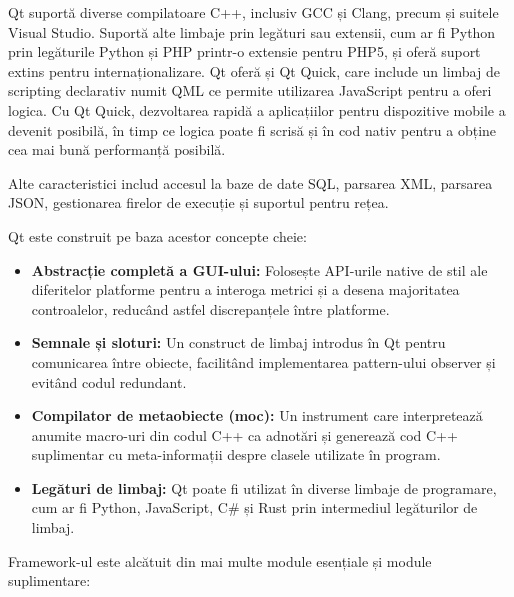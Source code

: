 \documentclass[a4paper,12pt]{report}
\begin{document}
Qt suportă diverse compilatoare C++, inclusiv GCC și Clang, precum și suitele Visual Studio. Suportă alte limbaje prin legături sau extensii, cum ar fi Python prin legăturile Python și PHP printr-o extensie pentru PHP5, și oferă suport extins pentru internaționalizare. Qt oferă și Qt Quick, care include un limbaj de scripting declarativ numit QML ce permite utilizarea JavaScript pentru a oferi logica. Cu Qt Quick, dezvoltarea rapidă a aplicațiilor pentru dispozitive mobile a devenit posibilă, în timp ce logica poate fi scrisă și în cod nativ pentru a obține cea mai bună performanță posibilă.

Alte caracteristici includ accesul la baze de date SQL, parsarea XML, parsarea JSON, gestionarea firelor de execuție și suportul pentru rețea.

Qt este construit pe baza acestor concepte cheie:
\begin{itemize}
    \item \textbf{Abstracție completă a GUI-ului:} Folosește API-urile native de stil ale diferitelor platforme pentru a interoga metrici și a desena majoritatea controalelor, reducând astfel discrepanțele între platforme.
    \item \textbf{Semnale și sloturi:} Un construct de limbaj introdus în Qt pentru comunicarea între obiecte, facilitând implementarea pattern-ului observer și evitând codul redundant.
    \item \textbf{Compilator de metaobiecte (moc):} Un instrument care interpretează anumite macro-uri din codul C++ ca adnotări și generează cod C++ suplimentar cu meta-informații despre clasele utilizate în program.
    \item \textbf{Legături de limbaj:} Qt poate fi utilizat în diverse limbaje de programare, cum ar fi Python, JavaScript, C\# și Rust prin intermediul legăturilor de limbaj.
\end{itemize}

Framework-ul este alcătuit din mai multe module esențiale și module suplimentare:
\end{document}
